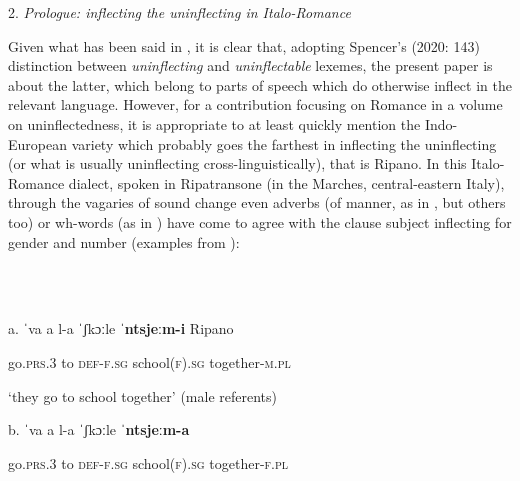 \documentclass[output=paper]{langscibook}
\begin{document}
\begin{styleBiblio}
2. \textit{Prologue: inflecting the uninflecting in Italo-Romance}
\end{styleBiblio}

Given what has been said in , it is clear that, adopting Spencer’s (2020: 143) distinction between \textit{uninflecting} and \textit{uninflectable} lexemes, the present paper is about the latter, which belong to parts of speech which do otherwise inflect in the relevant language. However, for a contribution focusing on Romance in a volume on uninflectedness, it is appropriate to at least quickly mention the Indo-European variety which probably goes the farthest in inflecting the uninflecting (or what is usually uninflecting cross-linguistically), that is Ripano. In this Italo-Romance dialect, spoken in Ripatransone (in the Marches, central-eastern Italy), through the vagaries of sound change even adverbs (of manner, as in , but others too) or wh-words (as in ) have come to agree with the clause subject inflecting for gender and number (examples from \citealt{PaciaroniLoporcaro2018}):

\begin{styleTabellaLUNGA}
\ea%
    \label{ex:key:1}
    \gll \\
         \\
    \glt
    \z %

          a.  ˈva     a  l-a     ˈʃkɔːle    \textbf{ˈntsjeːm-i}      Ripano
\end{styleTabellaLUNGA}

\begin{styleTabellaLUNGA}
    go.\textsc{prs.3}  to  \textsc{def-f.sg}   school(\textsc{f)}.\textsc{sg}  together\textsc{{}-m.pl}
\end{styleTabellaLUNGA}

\begin{styleTabellaLUNGA}
    ‘they go to school together’ (male referents)  
\end{styleTabellaLUNGA}

\begin{styleTabellaLUNGA}
  b.  ˈva     a  l-a     ˈʃkɔːle    \textbf{ˈntsjeːm-a}
\end{styleTabellaLUNGA}

\begin{styleTabellaLUNGA}
    go.\textsc{prs.3}  to  \textsc{def-f.sg}   school(\textsc{f)}.\textsc{sg}  together\textsc{{}-f.pl}
\end{styleTabellaLUNGA}
\end{document}
